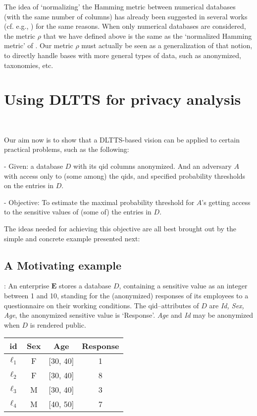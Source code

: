 \documentclass[pdflatex]{article}
\def \lft {\noindent}
\begin{document}
  \vspace*{-1mm}
  The idea of `normalizing'  the Hamming metric between numerical databases (with
  the  same number of columns) has already been suggested in several works (cf. e.g., 
  \cite{dpMetrics2013}) for the same   reasons. When only numerical databases are
  considered, the metric   $\rho$ that   we have defined above  is  the same as the
  `normalized Hamming   metric' of  \cite{dpMetrics2013}.  Our metric  $\rho$ must
  actually be seen as a generalization   of that  notion, to directly handle  bases
  with more general  types of  data,  such as anonymized,  taxonomies, etc.  

  \vspace*{-1em}
 \section{Using DLTTS for privacy analysis}~\label{Analysis}
 \vspace*{-1em}

 Our aim now  is to show that a DLTTS-based  vision can be applied to certain practical
 problems, such as the following: \par 
 - Given: a database $D$  with its  qid columns   anonymized. And
   an  adversary $A$ with access only to (some among) the qids, and  specified
   probability thresholds on the entries in $D$.  \par 
   -  Objective: To estimate the maximal probability threshold for $A$'s getting access
      to the sensitive values of (some of) the entries in $D$.


The ideas needed for achieving this objective are all best brought out by the
simple and concrete  example presented  next: 

\subsection{A Motivating example}
\lft {\sc Example}:
 An enterprise $\mathbf{E}$ stores a  database $D$, containing a  sensitive value as
 an integer  between 1 and 10, standing for the (anonymized)  responses of its  employees
 to a  questionnaire on their working conditions.  The qid--attributes of $D$ are  {\em Id,
   Sex, Age}, the anonymized  sensitive value  is `Response'. 
 {\em Age} and {\em Id}  may be anonymized when $D$ is rendered public. 

\begin{center}
\begin{tabular}{|c|c|c|c|}
\hline
\textbf{id} & \textbf{Sex} & \textbf{Age} & \textbf{Response} \\
\hline
$\ell_1$ & F & [30, 40] & 1\\
\hline
$\ell_2$ & F & [30, 40] & 8\\
\hline
$\ell_3$ & M & [30, 40] & 3\\
\hline
$\ell_4$ & M & [40, 50] & 7\\
\hline
\end{tabular}
\end{center}
\end{document}
